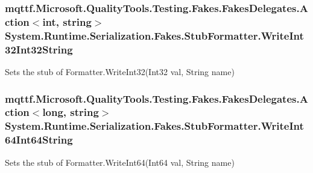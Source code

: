 \hypertarget{class_system_1_1_runtime_1_1_serialization_1_1_fakes_1_1_stub_formatter_ac7c7c97dd2b65470d52ffc4752b542af}{
\subsubsection[{Write\-Int32\-Int32\-String}]{\setlength{\rightskip}{0pt plus 5cm}mqttf.\-Microsoft.\-Quality\-Tools.\-Testing.\-Fakes.\-Fakes\-Delegates.\-Action$<$int, string$>$ System.\-Runtime.\-Serialization.\-Fakes.\-Stub\-Formatter.\-Write\-Int32\-Int32\-String}}\label{class_system_1_1_runtime_1_1_serialization_1_1_fakes_1_1_stub_formatter_ac7c7c97dd2b65470d52ffc4752b542af}


Sets the stub of Formatter.\-Write\-Int32(\-Int32 val, String name)

\hypertarget{class_system_1_1_runtime_1_1_serialization_1_1_fakes_1_1_stub_formatter_a3cfcc55ac8f5735c95cecdd7559dab2a}{
\subsubsection[{Write\-Int64\-Int64\-String}]{\setlength{\rightskip}{0pt plus 5cm}mqttf.\-Microsoft.\-Quality\-Tools.\-Testing.\-Fakes.\-Fakes\-Delegates.\-Action$<$long, string$>$ System.\-Runtime.\-Serialization.\-Fakes.\-Stub\-Formatter.\-Write\-Int64\-Int64\-String}}\label{class_system_1_1_runtime_1_1_serialization_1_1_fakes_1_1_stub_formatter_a3cfcc55ac8f5735c95cecdd7559dab2a}


Sets the stub of Formatter.\-Write\-Int64(\-Int64 val, String name)

